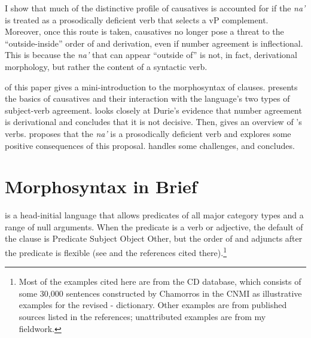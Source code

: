 \documentclass[output=paper,
modfonts
]{LSP/langsci}
\begin{document}
I show that much of the distinctive profile of  causatives is
accounted for if the  \emph{na'} is treated as a prosodically
deficient verb that selects a vP complement. Moreover, once this route
is taken,  causatives no longer pose a threat to the
``outside-inside'' order of  and derivation, even if number
agreement is inflectional. This is because the  \emph{na'} that
can appear ``outside of''  is not, in fact, derivational
morphology, but rather the  content of a syntactic
verb.

 of this paper gives a mini-introduction to the morphosyntax of
 clauses.  presents the basics of causatives and their
interaction with the language's two types of subject-verb agreement.
 looks closely at Durie's \citeyear{durie1986} evidence that  number
agreement is derivational and concludes that it is not decisive. Then,
 gives an overview of 's  verbs.
 proposes that the  \emph{na'} is a prosodically
deficient verb and explores some positive consequences of this proposal.
 handles some challenges, and  concludes.

\section{ Morphosyntax in Brief}\label{sec:chung:2}

 is a head-initial language that allows predicates of all major
category types and a range of null arguments. When the predicate is a
verb or adjective, the default  of the clause is Predicate
Subject Object Other, but the order of  and adjuncts after the
predicate is flexible (see \citealt{chung1998} and the references cited
there).\footnote{Most of the  examples cited here are from the CD database,
  which consists of some 30,000 sentences constructed by Chamorros in
  the CNMI as illustrative examples for the revised -
  dictionary. Other examples are from published sources listed in the
  references; unattributed examples are from my fieldwork.}
\end{document}
